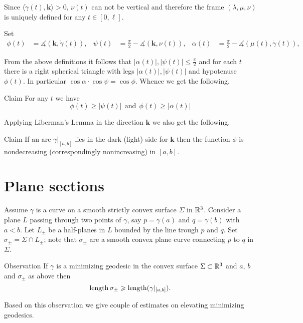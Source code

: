 \documentclass[a4paper,10pt]{amsart}
\begin{document}
Since $\langle\dot\gamma(t),\bm{k}\rangle>0$, 
$\nu(t)$ can not be vertical 
and therefore the frame $(\lambda,\mu,\nu)$ is uniquely defined for any $t\in[0,\ell]$.

Set 
\begin{align*}
\phi(t)&=\measuredangle(\bm{k},\dot\gamma(t)),&
\psi(t)&=\tfrac\pi2-\measuredangle(\bm{k},\nu(t)),&
\alpha(t)&=\tfrac\pi2-\measuredangle(\mu(t),\dot\gamma(t)),
\end{align*}

From the above definitions it follows that $|\alpha(t)|,|\psi(t)|\le \tfrac\pi2$ and for each $t$ there is a right spherical triangle with legs $|\alpha(t)|,|\psi(t)|$ and hypotenuse $\phi(t)$.
In particular $\cos\alpha\cdot\cos\psi=\cos\phi$.
Whence we get the following.

\begin{thm}{Claim}
For any $t$ we have 
\[
\phi(t)\ge |\psi(t)|\ \ \text{and}\ \ \phi(t)\ge |\alpha(t)|
\]

\end{thm}

Applying Liberman's Lemma in the direction $\bm{k}$ we also get the following.

\begin{thm}{Claim}
If an arc $\gamma|_{[a,b]}$ lies in the dark (light) side for $\bm{k}$ then 
the function $\phi$ is nondecreasing (correspondingly nonincreasing)
in $[a,b]$.
\end{thm}

\section{Plane sections}

Assume $\gamma$ is a curve on a smooth strictly convex surface $\Sigma$ in $\mathbb{R}^3$.
Consider a plane $L$ 
passing through two points of $\gamma$, 
say $p=\gamma(a)$ and $q=\gamma(b)$ with $a<b$.
Let $L_\pm$ be a  half-planes in $L$ bounded by the line trough $p$ and $q$.
Set $\sigma_\pm=\Sigma\cap L_\pm$;
note that $\sigma_\pm$ are a smooth convex plane curve connecting $p$ to $q$ in $\Sigma$.

\begin{thm}{Observation}\label{obs:cut}
If $\gamma$ is a minimizing geodesic in the convex surface $\Sigma\subset \mathbb{R}^3$ and $a$, $b$ and $\sigma_\pm$ as above then
\[\mathop{\rm length}\nolimits\sigma_\pm\geqslant\mathop{\rm length}\nolimits(\gamma|_{[a,b]}).\]
\end{thm}

Based on this observation we give couple of estimates on elevating minimizing geodesics.
\end{document}
